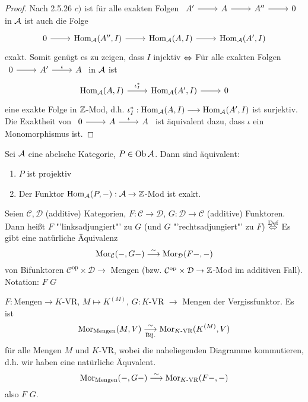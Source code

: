 \begin{proof}
	Nach 2.5.26 $c)$ ist für alle exakten Folgen $\begin{tikzcd}
	A' \arrow{r} & A \arrow{r} & A'' \arrow{r} & 0
	\end{tikzcd}$ in $\mathcal{A}$ ist auch die Folge
	$$\begin{tikzcd}
	0 \arrow{r}& \Hom_\A(A'', I) \arrow{r} & \Hom_\A(A,I) \arrow{r} & \Hom_\A(A',I)
	\end{tikzcd}$$
	exakt. Somit genügt es zu zeigen, dass $I$ injektiv $\Leftrightarrow$ Für alle exakten Folgen\\ $\begin{tikzcd}
	0 \arrow{r} & A' \arrow{r}{\iota} & A
	\end{tikzcd}$ in $\mathcal{A}$ ist 
	$$\begin{tikzcd}
	\Hom_\A(A,I) \arrow{r}{\iota_I^*} & \Hom_\A(A', I) \arrow{r} & 0
	\end{tikzcd}$$
	eine exakte Folge in $\mathbb{Z}$-Mod, d.h. $\iota_I^*:\operatorname{Hom}_{\mathcal{A}}(A,I) \longrightarrow \operatorname{Hom}_{\mathcal{A}}(A',I)$ ist surjektiv. Die Exaktheit von  $\begin{tikzcd}
	0 \arrow{r} & A \arrow{r}{\iota} & A
	\end{tikzcd}$ ist äquivalent dazu, dass $\iota$ ein Monomorphismus ist.
\end{proof}
\begin{bem}
	Sei $\mathcal{A}$ eine abelsche Kategorie, $P\in \text{Ob}\,\mathcal{A}$. Dann sind äquivalent:
	\begin{enumerate}[label= \roman*)]
		\item $P$ ist projektiv
		\item Der Funktor $\operatorname{Hom}_{\mathcal{A}}(P,-): \mathcal{A} \to \mathbb{Z}$-Mod ist exakt.
	\end{enumerate}
\end{bem}
\begin{df}
	Seien $\mathcal{C}, \mathcal{D}$  (additive) Kategorien, $F: \mathcal{C} \to \mathcal{D}$, $G: \mathcal{D} \to \mathcal{C}$ (additive) Funktoren. Dann heißt $F$ "'linksadjungiert"' zu $G$ (und $G$ "'rechtsadjungiert"' zu $F$) $\overset{\text{Def}}{\Leftrightarrow}$ Es gibt eine natürliche Äquivalenz
	$$\text{Mor}_\mathcal{C}(-, G -) \overset{\sim}{\longrightarrow} \text{Mor}_\mathcal{D}( F -, -)$$
	von Bifunktoren $\mathcal{C}^\text{op} \times \mathcal{D} \to$ Mengen (bzw. $\mathcal{C}^\text{op} \times \mathcal{D} \to \mathbb{Z}$-Mod im additiven Fall).\\
	Notation: $F $  $G$
\end{df}
\begin{bsp}
	$F: \text{Mengen} \to K$-VR, $M\mapsto K^{(M)}$, $G: K$-VR $ \to$ Mengen der Vergissfunktor. Es ist $$\text{Mor}_{\text{Mengen}}(M,V) \underset{\text{Bij.}}{\overset{\sim}{\longrightarrow}} \text{Mor}_{K\text{-VR}}(K^{(M)} , V)$$
	für alle Mengen $M$ und $K$-VR, wobei die naheliegenden Diagramme kommutieren, d.h. wir haben eine natürliche Äquvalent.
	$$\text{Mor}_\text{Mengen}(-, G-) \overset{\sim}{\longrightarrow} \text{Mor}_{K\text{-VR}}(F -, -)$$
	also $F$  $G$.
\end{bsp}
